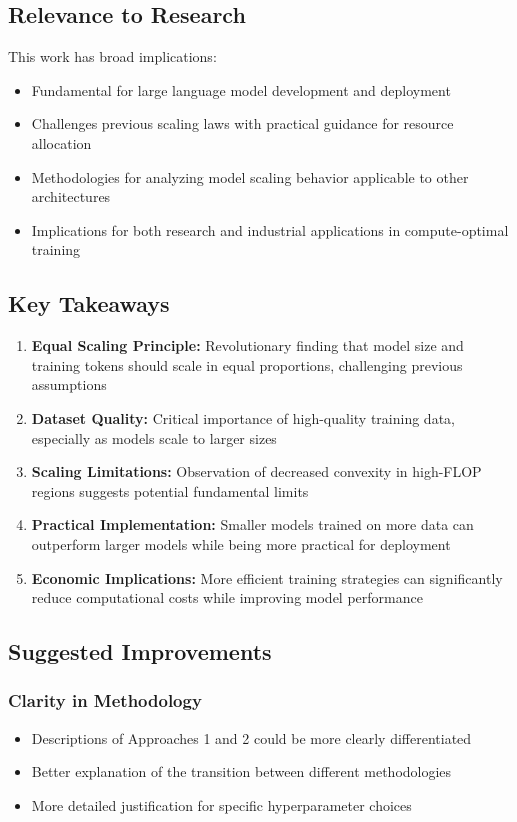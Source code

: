\documentclass{article}
\begin{document}
\subsection{Relevance to Research}
This work has broad implications:
\begin{itemize}
    \item Fundamental for large language model development and deployment
    \item Challenges previous scaling laws with practical guidance for resource allocation
    \item Methodologies for analyzing model scaling behavior applicable to other architectures
    \item Implications for both research and industrial applications in compute-optimal training
\end{itemize}

\subsection{Key Takeaways}
\begin{enumerate}
    \item \textbf{Equal Scaling Principle:} Revolutionary finding that model size and training tokens should scale in equal proportions, challenging previous assumptions
    
    \item \textbf{Dataset Quality:} Critical importance of high-quality training data, especially as models scale to larger sizes
    
    \item \textbf{Scaling Limitations:} Observation of decreased convexity in high-FLOP regions suggests potential fundamental limits
    
    \item \textbf{Practical Implementation:} Smaller models trained on more data can outperform larger models while being more practical for deployment
    
    \item \textbf{Economic Implications:} More efficient training strategies can significantly reduce computational costs while improving model performance
\end{enumerate}

\subsection{Suggested Improvements}
\subsubsection{Clarity in Methodology}
\begin{itemize}
    \item Descriptions of Approaches 1 and 2 could be more clearly differentiated
    \item Better explanation of the transition between different methodologies
    \item More detailed justification for specific hyperparameter choices
\end{itemize}
\end{document}
